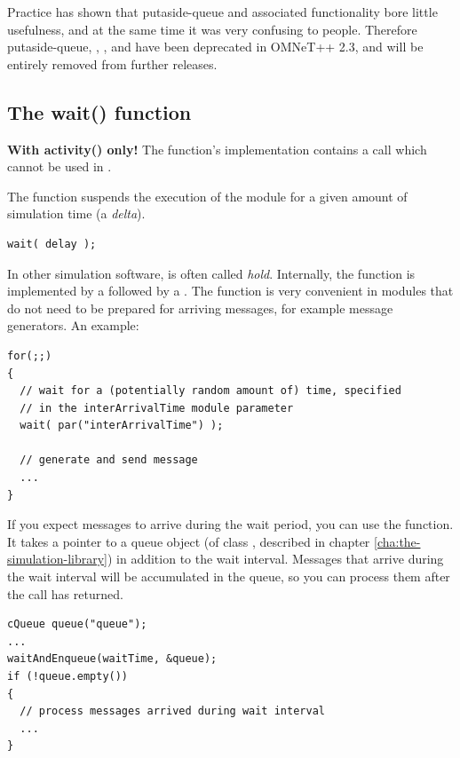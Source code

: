 Practice has shown that putaside-queue and associated functionality
bore little usefulness, and at the same time it was very confusing
to people. Therefore putaside-queue, , ,
and  have been deprecated in OMNeT++ 2.3, and
will be entirely removed from further releases.



\subsection{The wait() function}

\textbf{With activity() only!} The  function's implementation
contains a  call which cannot be used in .

The  function suspends the execution of the module for
a given amount of simulation time (a \textit{delta}).

\begin{verbatim}
wait( delay );
\end{verbatim}

In other simulation software,  is often called \textit{hold}.
Internally, the  function is implemented by a
 followed by a .
The  function is very convenient in modules that do not need
to be prepared for arriving messages, for example message generators.
An example:

\begin{verbatim}
for(;;)
{
  // wait for a (potentially random amount of) time, specified
  // in the interArrivalTime module parameter
  wait( par("interArrivalTime") );

  // generate and send message
  ...
}
\end{verbatim}

If you expect messages to arrive during the wait period, you can
use the  function. It takes a pointer to a queue object
(of class , described in chapter \ref{cha:the-simulation-library})
in addition to the wait interval. Messages that arrive during the
wait interval will be accumulated in the queue, so you can
process them after the  call has returned.

\begin{verbatim}
cQueue queue("queue");
...
waitAndEnqueue(waitTime, &queue);
if (!queue.empty())
{
  // process messages arrived during wait interval
  ...
}
\end{verbatim}


